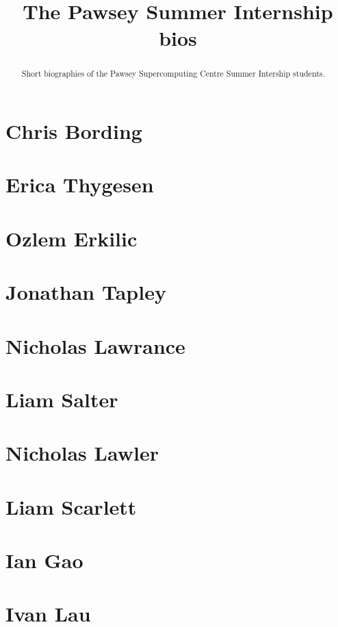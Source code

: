 \documentclass[11pt,a4paper]{report}
\title{The Pawsey Summer Internship bios}
\begin{document}
\maketitle
\tableofcontents


\begin{abstract}

Short biographies of the Pawsey Supercomputing Centre Summer Intership students.

\end{abstract}

\chapter{Chris Bording}


\chapter{Erica Thygesen}


\chapter{Ozlem Erkilic}


\chapter{Jonathan Tapley}


\chapter{Nicholas Lawrance}


\chapter{Liam Salter}


\chapter{Nicholas Lawler}


\chapter{Liam Scarlett}


\chapter{Ian Gao}


\chapter{Ivan Lau}

\end{document}
